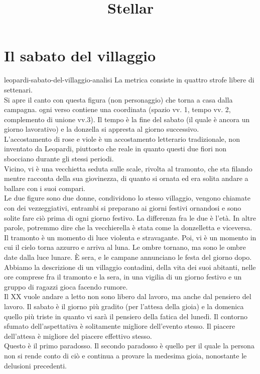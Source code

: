 \documentclass[preview]{standalone}
\begin{document}
\title{Stellar}
\genpage

\section{Il sabato del villaggio}


\begin{snippet}{leopardi-sabato-del-villaggio-analisi}
    La metrica consiste in quattro strofe libere di settenari.
    \\
    Si apre il canto con questa figura (non personaggio) che torna a casa dalla campagna.
    ogni verso contiene una coordinata (spazio vv. 1, tempo vv. 2, complemento di unione vv.3).
    Il tempo è la fine del sabato (il quale è ancora un giorno lavorativo)
    e la donzella si appresta al giorno successivo.
    \\
    L'accostamento di rose e viole è un accostamento letterario tradizionale,
    non inventato da Leopardi, piuttosto che reale in quanto
    questi due fiori non sbocciano durante gli stessi periodi.
    \\
    Vicino, vi è una vecchietta seduta sulle scale, rivolta al tramonto,
    che sta filando mentre racconta della sua giovinezza, di quanto si ornata
    ed era solita andare a ballare con i suoi compari.
    \\
    Le due figure sono due donne, condividono lo stesso villaggio,
    vengono chiamate con dei vezzeggiativi, entrambi si preparano ai giorni festivi ornandosi
    e sono solite fare ciò prima di ogni giorno festivo.
    La differenza fra le due è l'età.
    In altre parole, potremmo dire che la vecchierella è stata come la donzelletta
    e viceversa.
    \\
    Il tramonto è un momento di luce violenta e stravagante. Poi, vi è un momento in cui
    il cielo torna azzurro e arriva al luna. Le ombre tornano, ma sono le ombre date dalla
    luce lunare.
    È sera, e le campane annunciano le festa del giorno dopo.
    \\
    Abbiamo la descrizione di un villaggio contadini, della vita dei suoi abitanti,
    nelle ore comprese fra il tramonto e la sera, in una vigilia di un giorno festivo
    e un gruppo di ragazzi gioca facendo rumore.
    \\
    Il XX vuole andare a letto non sono libero dal lavoro, ma anche dal pensiero del lavoro.
    Il sabato è il giorno più gradito (per l'attesa della gioia) e la domenica quello più triste in quanto
    vi sarà il pensiero della fatica del lunedì.
    Il contorno sfumato dell'aspettativa è solitamente migliore dell'evento stesso.
    Il piacere dell'attesa è migliore del piacere effettivo stesso.
    \\
    Questo è il primo paradosso.
    Il secondo paradosso è quello per il quale la persona non si rende conto di ciò
    e continua a provare la medesima gioia, nonostante le delusioni precedenti.
\end{snippet}
\end{document}
